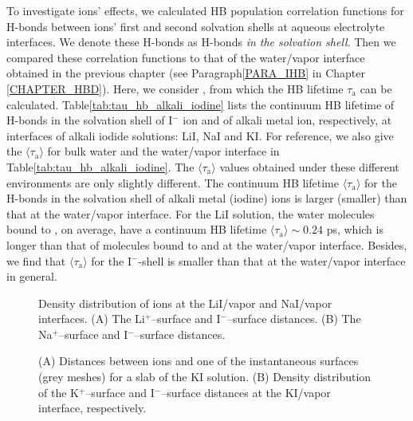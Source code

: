 To investigate ions' effects, we calculated HB population correlation functions for H-bonds between 
ions' first and second solvation shells at aqueous electrolyte interfaces.
We denote these H-bonds as H-bonds \emph{in the solvation shell}.
Then we compared these correlation functions to that of the water/vapor interface obtained in the previous chapter 
(see Paragraph\thinspace\ref{PARA_IHB} in Chapter \ref{CHAPTER_HBD}). 
Here, we consider \SHB, from which the HB lifetime $\tau_\text{a}$ can be calculated.
Table\thinspace\ref{tab:tau_hb_alkali_iodine} lists the continuum HB lifetime of H-bonds in the solvation shell 
of I$^-$ ion and of alkali metal ion, respectively, at interfaces of alkali iodide solutions: LiI, NaI and KI. 
For reference, we also give the $\langle\tau_\text{a}\rangle$ for bulk water and the water/vapor interface in Table\thinspace\ref{tab:tau_hb_alkali_iodine}.
The $\langle\tau_\text{a}\rangle$ values obtained under these different environments are only slightly different.
The continuum HB lifetime $\langle\tau_{\text{a}}\rangle$ for the H-bonds in the 
solvation shell of alkali metal (iodine) ions is larger (smaller) than 
that at the water/vapor interface. 
For the LiI solution, the water molecules bound to \Li, on average, have a continuum HB lifetime $\langle\tau_{\text{a}}\rangle \sim 0.24$ ps,
which is longer than that of molecules bound to \I and at the water/vapor interface. 
Besides, we find that $\langle\tau_{\text{a}}\rangle$ for the I$^-$-shell is smaller than that at the water/vapor interface in general.
\begin{figure}[H]%
    \centering
    \qquad
    \caption{
Density distribution of ions at the LiI/vapor and NaI/vapor interfaces.   
(A) 
The Li$^+$--surface and I$^-$--surface distances. 
(B)
The Na$^+$--surface and I$^-$--surface distances. 
}%
    \label{fig:prob_dist_Li_surf_I_surf}%
\end{figure}
\begin{figure}[H]%
    \centering
    \qquad
    \caption{
(A) 
Distances between ions and one of the instantaneous surfaces (grey meshes) for a slab of the KI solution. 
(B)
Density distribution of the K$^+$--surface and I$^-$--surface distances at the KI/vapor interface, respectively. 
}%
    \label{fig:prob_dist_K_surf_I_surf}%
\end{figure}
